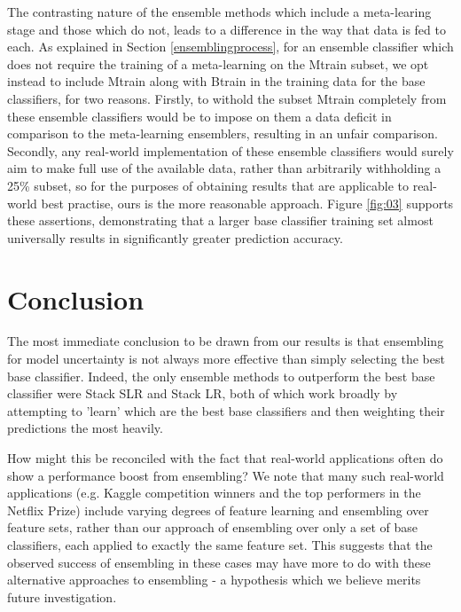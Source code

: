 \documentclass{bmcart}
\begin{document}
\noindent
The contrasting nature of the ensemble methods which include a meta-learing stage and those which do not, leads to a difference in the way that data is fed to each. As explained in Section \ref{ensemblingprocess}, for an ensemble classifier which does not require the training of a meta-learning on the Mtrain subset, we opt instead to include Mtrain along with Btrain in the training data for the base classifiers, for two reasons. Firstly, to withold the subset Mtrain completely from these ensemble classifiers would be to impose on them a data deficit in comparison to the meta-learning ensemblers, resulting in an unfair comparison. Secondly, any real-world implementation of these ensemble classifiers would surely aim to make full use of the available data, rather than arbitrarily withholding a 25\% subset, so for the purposes of obtaining results that are applicable to real-world best practise, ours is the more reasonable approach. Figure \ref{fig:03} supports these assertions, demonstrating that a larger base classifier training set almost universally results in significantly greater prediction accuracy.







\section*{Conclusion}

The most immediate conclusion to be drawn from our results is that ensembling for model uncertainty is not always more effective than simply selecting the best base classifier. Indeed, the only ensemble methods to outperform the best base classifier were Stack SLR and Stack LR, both of which work broadly by attempting to 'learn' which are the best base classifiers and then weighting their predictions the most heavily.

How might this be reconciled with the fact that real-world applications often do show a performance boost from ensembling? We note that many such real-world applications (e.g. Kaggle competition winners and the top performers in the Netflix Prize) include varying degrees of feature learning and ensembling over feature sets, rather than our approach of ensembling over only a set of base classifiers, each applied to exactly the same feature set. This suggests that the observed success of ensembling in these cases may have more to do with these alternative approaches to ensembling - a hypothesis which we believe merits future investigation.
\end{document}

